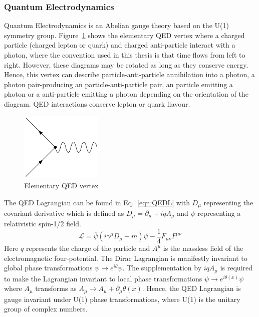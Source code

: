 \subsubsection{Quantum Electrodynamics}
\label{subsec:QED}

Quantum Electrodynamics is an Abelian gauge theory based on the U(1) symmetry group. Figure~\ref{fig:QEDvertex} shows the elementary QED vertex where a charged particle (charged lepton or quark) and charged anti-particle interact with a photon, where the convention used in this thesis is that time flows from left to right. However, these diagrams may be rotated as long as they conserve energy. Hence, this vertex can describe particle-anti-particle annihilation into a photon, a photon pair-producing an particle-anti-particle pair, an particle emitting a photon or a anti-particle emitting a photon depending on the orientation of the diagram. QED interactions conserve lepton or quark flavour.


\begin{figure}[ht!]
\begin{center}
    \includegraphics[width=0.35\textwidth]{images/Theory/QEDvertex.png}
    \caption{Elementary QED vertex}
    \label{fig:QEDvertex}
\end{center}
\end{figure}

The QED Lagrangian can be found in Eq.~\ref{eqn:QEDL} with $D_{\mu}$ representing the covariant derivative which is defined as $D_{\mu} = \partial_{\mu} + iqA_{\mu}$ and $\psi$ representing a relativistic spin-1/2 field. 
\begin{equation}
\mathcal{L} = \overline{\psi}\left(i\gamma^{\mu}D_{\mu}-m\right)\psi - \frac{1}{4}F_{\mu\nu}F^{\mu\nu}
\label{eqn:QEDL}
\end{equation}
Here $q$ represents the charge of the particle and $A^{\mu}$ is the massless field of the electromagnetic four-potential. The Dirac Lagrangian is manifestly invariant to global phase transformations $\psi \rightarrow e^{i\theta} \psi$. The supplementation by $iqA_{\mu}$ is required to make the Lagrangian invariant to local phase transformations $\psi \rightarrow e^{i\theta(x)} \psi$ where $A_{\mu}$ transforms as $A_{\mu} \rightarrow A_{\mu} + \partial_{\mu}\theta(x)$. Hence, the QED Lagrangian is gauge invariant under U(1) phase transformations, where U(1) is the unitary group of complex numbers. 

